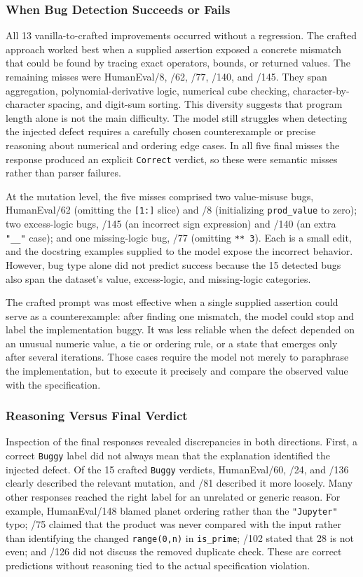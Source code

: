 \documentclass[sigconf,nonacm]{acmart}
\begin{document}
\subsubsection{When Bug Detection Succeeds or Fails}\hfill\break
All 13 vanilla-to-crafted improvements occurred without a regression. The
crafted approach worked best when a supplied assertion exposed a concrete
mismatch that could be found by tracing exact operators, bounds, or returned
values. The remaining misses were HumanEval/8, /62, /77, /140, and /145. They
span aggregation, polynomial-derivative logic, numerical cube checking,
character-by-character spacing, and digit-sum sorting. This diversity suggests
that program length alone is not the main difficulty. The model still struggles
when detecting the injected defect requires a carefully chosen counterexample
or precise reasoning about numerical and ordering edge cases. In all five final
misses the response produced an explicit \texttt{Correct} verdict, so these
were semantic misses rather than parser failures.

At the mutation level, the five misses comprised two value-misuse bugs,
HumanEval/62 (omitting the \texttt{[1:]} slice) and /8 (initializing
\texttt{prod\_value} to zero); two excess-logic bugs, /145 (an incorrect sign
expression) and /140 (an extra \texttt{"\_\_"} case); and one missing-logic
bug, /77 (omitting \texttt{** 3}). Each is a small edit, and the docstring
examples supplied to the model expose the incorrect behavior. However, bug
type alone did not predict success because the 15 detected bugs also span the
dataset's value, excess-logic, and missing-logic categories.

The crafted prompt was most effective when a single supplied assertion could
serve as a counterexample: after finding one mismatch, the model could stop and
label the implementation buggy. It was less reliable when the defect depended
on an unusual numeric value, a tie or ordering rule, or a state that emerges
only after several iterations. Those cases require the model not merely to
paraphrase the implementation, but to execute it precisely and compare the
observed value with the specification.

\subsubsection{Reasoning Versus Final Verdict}\hfill\break
Inspection of the final responses revealed discrepancies in both directions.
First, a correct \texttt{Buggy} label did not always mean that the explanation
identified the injected defect. Of the 15 crafted \texttt{Buggy} verdicts,
HumanEval/60, /24, and /136 clearly described the relevant mutation, and /81
described it more loosely. Many other responses reached the right label for an
unrelated or generic reason. For example, HumanEval/148 blamed planet ordering
rather than the \texttt{"Jupyter"} typo; /75 claimed that the product was never
compared with the input rather than identifying the changed
\texttt{range(0,n)} in \texttt{is\_prime}; /102 stated that 28 is not even; and
/126 did not discuss the removed duplicate check. These are correct
predictions without reasoning tied to the actual specification violation.
\end{document}
